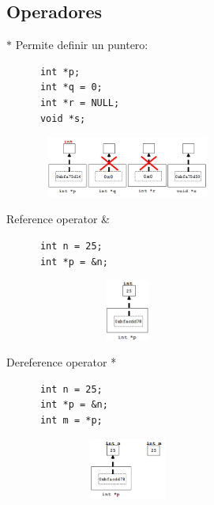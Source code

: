 \documentclass[xcolor=table,spanish,9pt]{beamer}
\begin{document}
\subsection{Operadores}

\begin{frame}[fragile]
  \begin{block}{$*$}
    Permite definir un puntero:
    \begin{lstlisting}
      int *p;
      int *q = 0;
      int *r = NULL;
      void *s;
    \end{lstlisting}
  \end{block}
  \begin{figure}
    \centering
    \includegraphics[width=6cm,height=2cm,keepaspectratio=true,clip=true]
    {./figures/pointers_definitions.png}\\
  \end{figure}
\end{frame}

\begin{frame}[fragile]
  \begin{block}{Reference operator \&}
    \begin{lstlisting}
      int n = 25;
      int *p = &n;
    \end{lstlisting}
  \end{block}
  \begin{figure}
    \centering
    \includegraphics[width=6cm,height=2cm,keepaspectratio=true,clip=true]
    {./figures/pointer_to_int.png}\\
  \end{figure}
\end{frame}

\begin{frame}[fragile]
  \begin{block}{Dereference operator *}
    \begin{lstlisting}
      int n = 25;
      int *p = &n;
      int m = *p;
    \end{lstlisting}
  \end{block}
  \begin{figure}
    \centering
    \includegraphics[width=6cm,height=2cm,keepaspectratio=true,clip=true]
    {./figures/dereference.png}\\
  \end{figure}
\end{frame}
\end{document}
